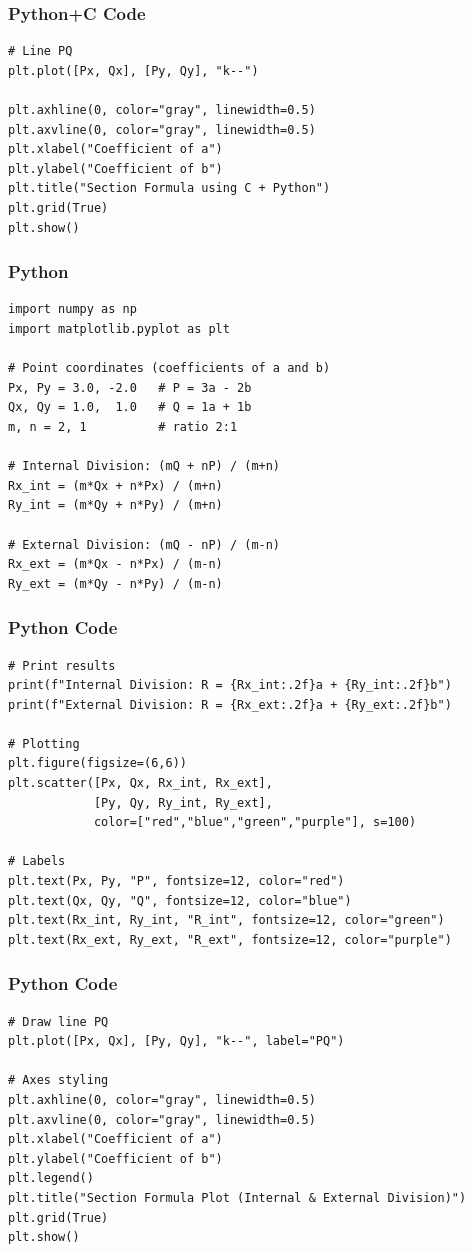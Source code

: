 \documentclass{beamer}
\begin{document}
\begin{frame}[fragile]
    \frametitle{Python+C Code}
    \begin{lstlisting}
# Line PQ
plt.plot([Px, Qx], [Py, Qy], "k--")

plt.axhline(0, color="gray", linewidth=0.5)
plt.axvline(0, color="gray", linewidth=0.5)
plt.xlabel("Coefficient of a")
plt.ylabel("Coefficient of b")
plt.title("Section Formula using C + Python")
plt.grid(True)
plt.show()

    \end{lstlisting}
\end{frame}
\begin{frame}[fragile]
    \frametitle{Python}
    \begin{lstlisting}
import numpy as np
import matplotlib.pyplot as plt

# Point coordinates (coefficients of a and b)
Px, Py = 3.0, -2.0   # P = 3a - 2b
Qx, Qy = 1.0,  1.0   # Q = 1a + 1b
m, n = 2, 1          # ratio 2:1

# Internal Division: (mQ + nP) / (m+n)
Rx_int = (m*Qx + n*Px) / (m+n)
Ry_int = (m*Qy + n*Py) / (m+n)

# External Division: (mQ - nP) / (m-n)
Rx_ext = (m*Qx - n*Px) / (m-n)
Ry_ext = (m*Qy - n*Py) / (m-n)
\end{lstlisting}
\end{frame}
\begin{frame}[fragile]
    \frametitle{Python Code}
    \begin{lstlisting}
# Print results
print(f"Internal Division: R = {Rx_int:.2f}a + {Ry_int:.2f}b")
print(f"External Division: R = {Rx_ext:.2f}a + {Ry_ext:.2f}b")

# Plotting
plt.figure(figsize=(6,6))
plt.scatter([Px, Qx, Rx_int, Rx_ext],
            [Py, Qy, Ry_int, Ry_ext],
            color=["red","blue","green","purple"], s=100)

# Labels
plt.text(Px, Py, "P", fontsize=12, color="red")
plt.text(Qx, Qy, "Q", fontsize=12, color="blue")
plt.text(Rx_int, Ry_int, "R_int", fontsize=12, color="green")
plt.text(Rx_ext, Ry_ext, "R_ext", fontsize=12, color="purple")
\end{lstlisting}
\end{frame}
\begin{frame}[fragile]
    \frametitle{Python Code}
    \begin{lstlisting}
# Draw line PQ
plt.plot([Px, Qx], [Py, Qy], "k--", label="PQ")

# Axes styling
plt.axhline(0, color="gray", linewidth=0.5)
plt.axvline(0, color="gray", linewidth=0.5)
plt.xlabel("Coefficient of a")
plt.ylabel("Coefficient of b")
plt.legend()
plt.title("Section Formula Plot (Internal & External Division)")
plt.grid(True)
plt.show()
\end{lstlisting}
\end{frame}
\end{document}
